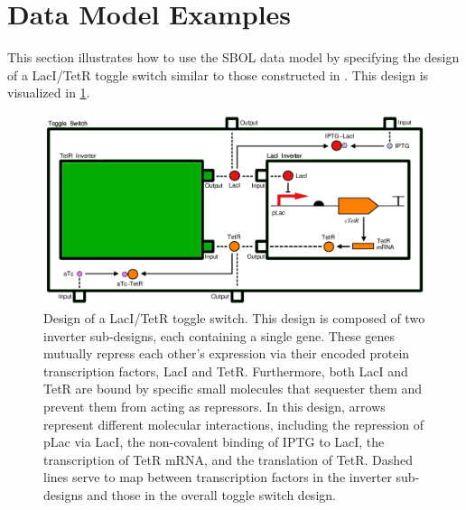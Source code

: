 \section{Data Model Examples}
\label{sec:examples}


This section illustrates how to use the SBOL data model by specifying the design of a LacI/TetR toggle switch similar to those constructed in \cite{Gardner2000}. This design is visualized in \ref{images:toggleswitch_modular}. 

\begin{figure}[ht]
\begin{center}
\includegraphics[scale=0.4]{images/toggleswitch_modular}
\caption[]{Design of a LacI/TetR toggle switch. This design is composed of two inverter sub-designs, each containing a single gene. These genes mutually repress each other's expression via their encoded protein transcription factors, LacI and TetR. Furthermore, both LacI and TetR are bound by specific small molecules that sequester them and prevent them from acting as repressors. In this design, arrows represent different molecular interactions, including the repression of pLac via LacI, the non-covalent binding of IPTG to LacI, the transcription of TetR mRNA, and the translation of TetR. Dashed lines serve to map between transcription factors in the inverter sub-designs and those in the overall toggle switch design.}
\label{images:toggleswitch_modular}
\end{center}
\end{figure}

